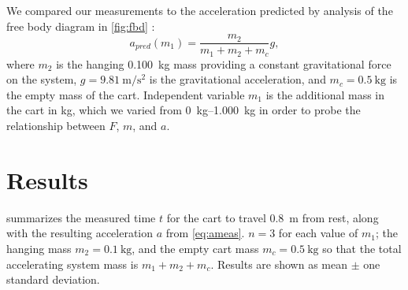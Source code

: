 ﻿\documentclass[reprint,amsmath,amssymb,aps]{revtex4-2}
\begin{document}

We compared our measurements to the acceleration predicted by analysis of the free body diagram in \cref{fig:fbd} \cite{knight2017physics}:
\begin{equation}
a_{pred}(m_1) = \dfrac{m_2}{m_1 + m_2 + m_c} g,
\label{eq:apred}
\end{equation}
where $m_2$ is the hanging \qty{0.100}{\kilo\gram} mass providing a constant gravitational force on the system, $g=\qty{9.81}{\meter\per\second\squared}$ is the gravitational acceleration, and $m_c=\qty{0.5}{\kilo\gram}$ is the empty mass of the cart. Independent variable $m_1$ is the additional mass in the cart in \unit{\kilo\gram}, which we varied from \qtyrange{0}{1.000}{\kilo\gram} in order to probe the relationship between $F$, $m$, and $a$.  






\section{Results}

 summarizes the measured time $t$ for the cart to travel \qty{0.8}{\meter} from rest, along with the resulting acceleration $a$ from \cref{eq:ameas}. $n=3$ for each value of $m_1$; the hanging mass $m_2=\qty{0.1}{\kilo\gram}$, and the empty cart mass $m_c=\qty{0.5}{\kilo\gram}$ so that the total accelerating system mass is $m_1+m_2+m_c$. Results are shown as mean $\pm$ one standard deviation. 

\end{document}
